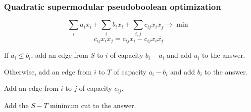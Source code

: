 \subsubsection*{Quadratic supermodular pseudoboolean optimization}
\[\sum_i a_i x_i + \sum_i b_i \overline{x_i} + \sum_{i, j} c_{i j} x_i \overline{x_j} \to \min\]
\[c_{i j} x_i x_j = c_{i j} x_i - c_{i j} x_i \overline{x_j}\]

If $a_i \le b_i$,
add an edge from $S$ to $i$ of capacity $b_i - a_i$
and add $a_i$ to the answer.

Otherwise,
add an edge from $i$ to $T$ of capacity $a_i - b_i$
and add $b_i$ to the answer.

Add an edge from $i$ to $j$ of capacity $c_{i j}$.

Add the $S-T$ minimum cut to the answer.
